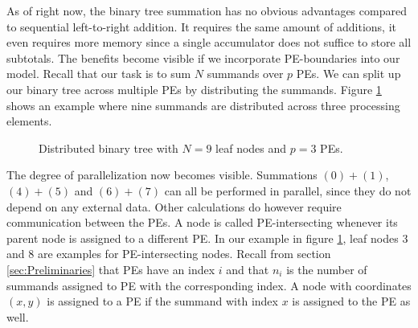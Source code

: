 As of right now, the binary tree summation has no obvious advantages compared to sequential left-to-right addition. It requires the same amount of
additions, it even requires more memory since a single accumulator does not suffice to store all subtotals. The benefits become visible if we
incorporate PE-boundaries into our model. Recall that our task is to sum $N$ summands over $p$ PEs. We can split up our binary tree across
multiple PEs by distributing the summands. Figure \ref{fig:distributed_binary_tree} shows an example where nine summands are distributed
across three processing elements.
\begin{figure}[H]
\centering
{}
\caption{Distributed binary tree with $N=9$ leaf nodes and $p=3$ PEs.}
\label{fig:distributed_binary_tree}
\end{figure}
The degree of parallelization now becomes visible. Summations $(0) + (1)$, $(4) + (5)$ and $(6) + (7)$ can all be performed in parallel, since
they do not depend on any external data. Other calculations do however require communication between the PEs. A node is called PE-intersecting
whenever its parent node is assigned to a different PE. In our example in figure \ref{fig:distributed_binary_tree}, leaf nodes $3$ and $8$ are examples
for PE-intersecting nodes.
Recall from section \ref{sec:Preliminaries} that PEs have an index $i$ and that $n_i$ is the number of summands assigned to PE with the corresponding
index. A node with coordinates $(x, y)$ is assigned to a PE if the summand with index $x$ is assigned to the PE as well.
